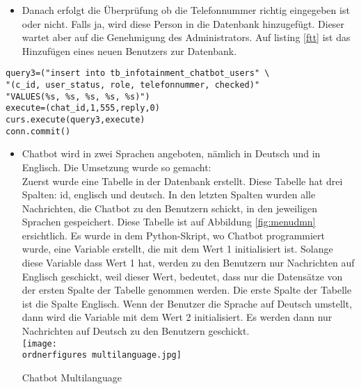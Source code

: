 \label{fgeee}
\begin{itemize}
	\item Danach erfolgt die Überprüfung ob die Telefonnummer richtig eingegeben ist oder nicht. Falls ja, wird diese Person in die Datenbank hinzugefügt. Dieser wartet aber auf die Genehmigung des Administrators. Auf listing \ref{ftt} ist das Hinzufügen eines neuen Benutzers zur Datenbank.
\end{itemize}
\begin{lstlisting}[frame=single] 
query3=("insert into tb_infotainment_chatbot_users" \
"(c_id, user_status, role, telefonnummer, checked)"
"VALUES(%s, %s, %s, %s, %s)")
execute=(chat_id,1,555,reply,0)
curs.execute(query3,execute)
conn.commit()
\end{lstlisting}
\label{ftt}
\begin{itemize}
	\item Chatbot wird in zwei Sprachen angeboten, n\"amlich in Deutsch und in Englisch. Die Umsetzung wurde so gemacht: \\
		Zuerst wurde eine Tabelle in der Datenbank erstellt. Diese Tabelle hat drei Spalten: id, englisch und deutsch. In den letzten Spalten wurden alle Nachrichten, die Chatbot zu den Benutzern schickt, in den jeweiligen Sprachen gespeichert. Diese Tabelle ist auf Abbildung \ref{fig:menudmn} ersichtlich. 
		Es wurde in dem Python-Skript, wo Chatbot programmiert wurde, eine Variable erstellt, die mit dem Wert 1 initialisiert ist. Solange diese Variable dass Wert 1 hat, werden zu den Benutzern nur Nachrichten auf Englisch geschickt, weil dieser Wert, bedeutet, dass nur die Datens\"atze von der ersten Spalte der Tabelle genommen werden. Die erste Spalte der Tabelle ist die Spalte Englisch. Wenn der Benutzer die Sprache auf Deutsch umstellt, dann wird die Variable mit dem Wert 2 initialisiert. Es werden dann nur Nachrichten auf Deutsch zu den Benutzern geschickt. \\
		\captionsetup{type=figure}
		\texttt{[image: \\ordnerfigures multilanguage.jpg]}
		\caption{Chatbot Multilanguage} 
		\label{fig:menudmn}
\end{itemize}
